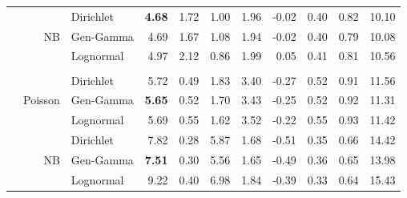 \documentclass[12pt]{article}
\begin{document}
\begin{table}[!htb]
\begin{tabular}{>{\raggedleft\arraybackslash}p{0.45in}|r | >{\raggedleft\arraybackslash}p{0.85in} | r r r r r r r r}
\midrule

\multirow{7}{*}{HSGP}
& \multirow{3}{*}{NB}
& \cellcolor{delayC!25}Dirichlet & \cellcolor{delayC!25}\bf  4.68 & \cellcolor{delayC!25}1.72 & \cellcolor{delayC!25}1.00 & \cellcolor{delayC!25}1.96 & \cellcolor{delayC!25}-0.02 & \cellcolor{delayC!25}0.40 & \cellcolor{delayC!25}0.82 & \cellcolor{delayC!25}10.10 \\
& & \cellcolor{delayB!25}Gen-Gamma & \cellcolor{delayB!25}4.69 & \cellcolor{delayB!25}1.67 & \cellcolor{delayB!25}1.08 & \cellcolor{delayB!25}1.94 & \cellcolor{delayB!25}-0.02 & \cellcolor{delayB!25}0.40 & \cellcolor{delayB!25}0.79 & \cellcolor{delayB!25}10.08 \\
& & \cellcolor{delayA!25}Lognormal & \cellcolor{delayA!25}4.97 & \cellcolor{delayA!25}2.12 & \cellcolor{delayA!25}0.86 & \cellcolor{delayA!25}1.99 & \cellcolor{delayA!25}0.05 & \cellcolor{delayA!25}0.41 & \cellcolor{delayA!25}0.81 & \cellcolor{delayA!25}10.56 \\

\\

& \multirow{3}{*}{Poisson}
& \cellcolor{delayC!25}Dirichlet & \cellcolor{delayC!25}5.72 & \cellcolor{delayC!25}0.49 & \cellcolor{delayC!25}1.83 & \cellcolor{delayC!25}3.40 & \cellcolor{delayC!25}-0.27 & \cellcolor{delayC!25}0.52 & \cellcolor{delayC!25}0.91 & \cellcolor{delayC!25}11.56 \\
& & \cellcolor{delayB!25}Gen-Gamma & \cellcolor{delayB!25}\bf 5.65 & \cellcolor{delayB!25}0.52 & \cellcolor{delayB!25}1.70 & \cellcolor{delayB!25}3.43 & \cellcolor{delayB!25}-0.25 & \cellcolor{delayB!25}0.52 & \cellcolor{delayB!25}0.92 & \cellcolor{delayB!25}11.31 \\
& & \cellcolor{delayA!25}Lognormal & \cellcolor{delayA!25}5.69 & \cellcolor{delayA!25}0.55 & \cellcolor{delayA!25}1.62 & \cellcolor{delayA!25}3.52 & \cellcolor{delayA!25}-0.22 & \cellcolor{delayA!25}0.55 & \cellcolor{delayA!25}0.93 & \cellcolor{delayA!25}11.42 \\

\midrule

\multirow{7}{*}{SIR}
& \multirow{3}{*}{NB}
& \cellcolor{delayC!25}Dirichlet & \cellcolor{delayC!25}7.82 & \cellcolor{delayC!25}0.28 & \cellcolor{delayC!25}5.87 & \cellcolor{delayC!25}1.68 & \cellcolor{delayC!25}-0.51 & \cellcolor{delayC!25}0.35 & \cellcolor{delayC!25}0.66 & \cellcolor{delayC!25}14.42 \\
& & \cellcolor{delayB!25}Gen-Gamma & \cellcolor{delayB!25}\bf 7.51 & \cellcolor{delayB!25}0.30 & \cellcolor{delayB!25}5.56 & \cellcolor{delayB!25}1.65 & \cellcolor{delayB!25}-0.49 & \cellcolor{delayB!25}0.36 & \cellcolor{delayB!25}0.65 & \cellcolor{delayB!25}13.98 \\
& & \cellcolor{delayA!25}Lognormal & \cellcolor{delayA!25}9.22 & \cellcolor{delayA!25}0.40 & \cellcolor{delayA!25}6.98 & \cellcolor{delayA!25}1.84 & \cellcolor{delayA!25}-0.39 & \cellcolor{delayA!25}0.33 & \cellcolor{delayA!25}0.64 & \cellcolor{delayA!25}15.43 \\


\end{tabular}
\end{table}
\end{document}

